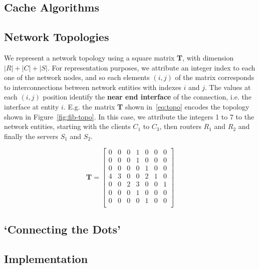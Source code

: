 \subsection{Cache Algorithms}
\label{subsec:meth-caching-algs}

\subsection{Network Topologies}
\label{subsec:meth-topologies}

We represent a network topology using a square matrix \textbf{T}, 
with dimension $|R|+|C|+|S|$. For representation purposes, we attribute an 
integer index to each one of the network nodes, and so each elements $(i,j)$ of the 
matrix corresponds to interconnections between network entities with indexes $i$ and $j$. The 
values at each $(i,j)$ position identify the \textbf{near end interface} of the 
connection, i.e. the interface at entity $i$. E.g. the matrix \textbf{T} shown 
in~\ref{eq:topo} encodes the topology shown in Figure~\ref{fig:fib-topo}. In this case, 
we attribute the integers 1 to 7 to the network entities, starting with the 
clients $C_1$ to $C_3$, then routers $R_1$ and $R_2$ and 
finally the servers $S_1$ and $S_2$.

\begin{equation}
\textbf{T} = \begin{bmatrix} 
                0 & 0 & 0 & 1 & 0 & 0 & 0               \\ 
                0 & 0 & 0 & 1 & 0 & 0 & 0               \\ 
                0 & 0 & 0 & 0 & 1 & 0 & 0               \\ 
                4 & 3 & 0 & 0 & 2 & 1 & 0               \\ 
                0 & 0 & 2 & 3 & 0 & 0 & 1               \\ 
                0 & 0 & 0 & 1 & 0 & 0 & 0               \\ 
                0 & 0 & 0 & 0 & 1 & 0 & 0               \\ \end{bmatrix}
    \label{eq:topo}
\end{equation}\shortvertbreak

\subsection{`Connecting the Dots'}
\label{subsec:meth-conn-dots}

\subsection{Implementation}
\label{subsec:meth-impl}

